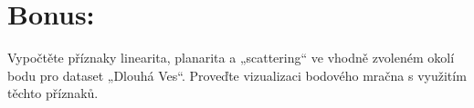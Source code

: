 \section{Bonus:}
Vypočtěte příznaky linearita, planarita a „scattering“ ve vhodně zvoleném okolí bodu pro dataset „Dlouhá Ves“. Proveďte vizualizaci bodového mračna s
využitím těchto příznaků.